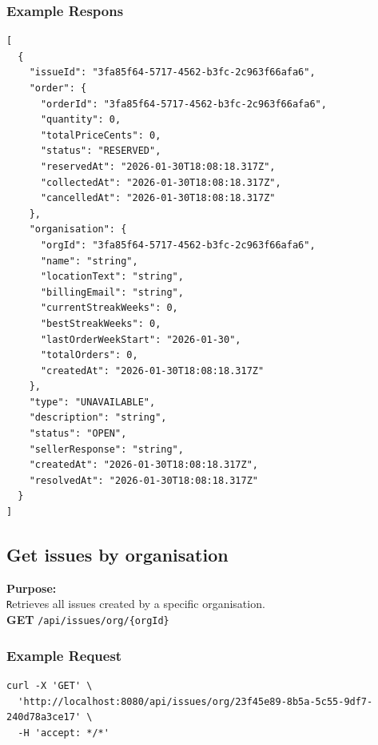 \documentclass[a4paper,11pt]{article}
\begin{document}
\subsubsection*{Example Respons}
\begin{lstlisting}
[
  {
    "issueId": "3fa85f64-5717-4562-b3fc-2c963f66afa6",
    "order": {
      "orderId": "3fa85f64-5717-4562-b3fc-2c963f66afa6",
      "quantity": 0,
      "totalPriceCents": 0,
      "status": "RESERVED",
      "reservedAt": "2026-01-30T18:08:18.317Z",
      "collectedAt": "2026-01-30T18:08:18.317Z",
      "cancelledAt": "2026-01-30T18:08:18.317Z"
    },
    "organisation": {
      "orgId": "3fa85f64-5717-4562-b3fc-2c963f66afa6",
      "name": "string",
      "locationText": "string",
      "billingEmail": "string",
      "currentStreakWeeks": 0,
      "bestStreakWeeks": 0,
      "lastOrderWeekStart": "2026-01-30",
      "totalOrders": 0,
      "createdAt": "2026-01-30T18:08:18.317Z"
    },
    "type": "UNAVAILABLE",
    "description": "string",
    "status": "OPEN",
    "sellerResponse": "string",
    "createdAt": "2026-01-30T18:08:18.317Z",
    "resolvedAt": "2026-01-30T18:08:18.317Z"
  }
]
\end{lstlisting}

\subsection{Get issues by organisation}
\textbf{Purpose:} \\ \texttt Retrieves all issues created by a specific organisation. \\

\textbf{GET} \texttt{/api/issues/org/\{orgId\}}

\subsubsection*{Example Request}
\begin{lstlisting}
curl -X 'GET' \
  'http://localhost:8080/api/issues/org/23f45e89-8b5a-5c55-9df7-240d78a3ce17' \
  -H 'accept: */*'
\end{lstlisting}
\end{document}
